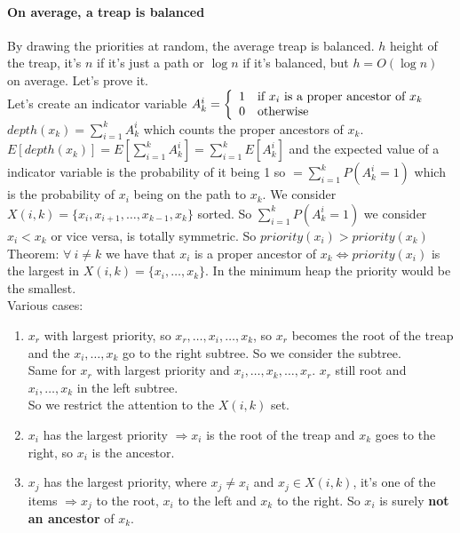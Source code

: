 \documentclass[10pt]{report}
\begin{document}
\paragraph{On average, a treap is balanced} By drawing the priorities at random, the average treap is balanced. $h$ height of the treap, it's $n$ if it's just a path or $\log n$ if it's balanced, but $h = O(\log n)$ on average. Let's prove it.\\
Let's create an indicator variable $A_k^i = \left\{ \begin{array}{c l}
1&\hbox{if }x_i\hbox{ is a proper ancestor of }x_k\\
0&\hbox{otherwise}
\end{array}\right.$\\
$depth(x_k) = \sum_{i=1}^k A_k^i$ which counts the proper ancestors of $x_k$. $E[depth(x_k)] = E[\sum_{i=1}^k A_k^i] = \sum_{i=1}^k E[A_k^i]$ and the expected value of a indicator variable is the probability of it being 1 so $= \sum_{i=1}^k P(A_k^i = 1)$ which is the probability of $x_i$ being on the path to $x_k$. We consider $X(i,k)=\{x_i,x_{i+1},\ldots,x_{k-1}, x_k\}$ sorted. So $\sum_{i=1}^k P(A_k^i = 1)$ we consider $x_i < x_k$ or vice versa, is totally symmetric. So $priority(x_i) > priority(x_k)$\\
Theorem: $\forall\: i \neq k$ we have that $x_i$ is a proper ancestor of $x_k \Leftrightarrow priority(x_i)$ is the largest in $X(i,k) = \{x_i,\ldots,x_k\}$. In the minimum heap the priority would be the smallest.\\
Various cases:
\begin{enumerate}
	\item $x_r$ with largest priority, so $x_r,\ldots, x_i,\ldots, x_k$, so $x_r$ becomes the root of the treap and the $x_i,\ldots, x_k$ go to the right subtree. So we consider the subtree.\\
	Same for $x_r$ with largest priority and $x_i,\ldots, x_k,\ldots, x_r$. $x_r$ still root and $x_i,\ldots,x_k$ in the left subtree.\\
	So we restrict the attention to the $X(i,k)$ set.
	\item $x_i$ has the largest priority $\Rightarrow x_i$ is the root of the treap and $x_k$ goes to the right, so $x_i$ is the ancestor.
	\item $x_j$ has the largest priority, where $x_j\neq x_i$ and $x_j \in X(i,k)$, it's one of the items $\Rightarrow x_j$ to the root, $x_i$ to the left and $x_k$ to the right. So $x_i$ is surely \textbf{not an ancestor} of $x_k$.
\end{enumerate}
\end{document}

